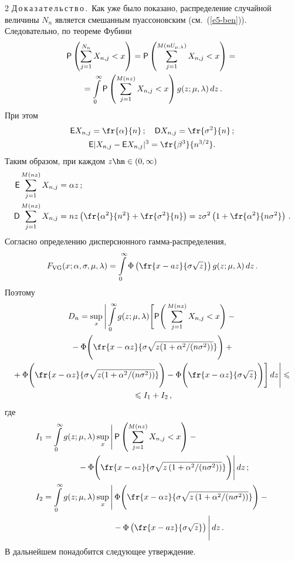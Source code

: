 \begin{multicols}{2}
\noindent
Д\,о\,к\,а\,з\,а\,т\,е\,л\,ь\,с\,т\,в\,о\,.\ Как уже было показано, распределение
случайной величины $N_n$ является смешанным пуассоновским (см.~(\ref{e5-ben})).
Следовательно, по теореме Фубини
\begin{multline*}
{\sf P}\left(\sum\limits_{j=1}^{N_n}X_{n,j}<x\right)=
{\sf P}\left(\sum\limits_{j=1}^{M(nU_{\mu,\lambda})}X_{n,j}<x\right)={}\\
{}=
\int\limits_0^{\infty}{\sf P}\left(\sum\limits_{j=1}^{M(nz)}X_{n,j}<x\right)g(z;\mu,\lambda)\,dz\,.
\end{multline*}
При этом
\begin{gather*}
{\sf E}X_{n,j}=\fr{\alpha}{n}\,;\quad
{\sf D}X_{n,j}=\fr{\sigma^2}{n}\,;\\ 
{\sf E}|X_{n,j}-{\sf E}X_{n,j}|^3=\fr{\beta^3}{n^{3/2}}.
\end{gather*}
Таким образом, при каждом $z\hm\in(0,\infty)$
\begin{align*}
{\sf E}\sum\limits_{j=1}^{M(nz)}X_{n,j}&=\alpha z\,;
\\
{\sf D}\sum\limits_{j=1}^{M(nz)}X_{n,j}&=nz\left(\fr{\alpha^2}{n^2}+\fr{\sigma^2}{n}\right)=
z\sigma^2\left(1+\fr{\alpha^2}{n\sigma^2}\right)\,.
\end{align*}
Согласно определению дисперсионного гам\-ма-рас\-пре\-де\-ления,
$$
F_{\mathrm{VG}}(x;\alpha,\sigma,\mu,\lambda)=\int\limits_{0}^{\infty}
\Phi\left(\fr{x-az}{\sigma\sqrt{z}}\right)g(z;\mu,\lambda)\,dz\,.
$$
Поэтому
\begin{multline}
D_n=\sup_x\Bigg|\int\limits_{0}^{\infty}g(z;\mu,\lambda)\Bigg[{\sf P}
\Bigg(\sum\limits_{j=1}^{M(nz)}X_{n,j}<x\Bigg)-{}\\
{}-\Phi\Bigg(\fr{x-\alpha z}
{\sigma\sqrt{z(1+{\alpha^2}/({n\sigma^2}))}}\Bigg)+{}\\
{}+\Phi\Bigg(\fr{x-\alpha z}{\sigma\sqrt{z(1+{\alpha^2}/({n\sigma^2}))}}\Bigg)-
\Phi\Bigg(\fr{x-\alpha z}{\sigma\sqrt{z}}\Bigg)\Bigg]\,dz\Bigg| \leqslant{}\\
{}\leqslant I_1+I_2\,,
\label{e6-ben}
\end{multline}
где
\begin{align*}
I_1&=\int\limits_{0}^{\infty}g(z;\mu,\lambda)\sup_x\Bigg|\,{\sf P}
\left(\sum\limits_{j=1}^{M(nz)}X_{n,j}<x\right)-{}\\
&\hspace*{15mm}{}-\Phi\Bigg(\fr{x-\alpha z}
{\sigma\sqrt{z\left(1+{\alpha^2}/(n\sigma^2)\right)}}\Bigg)\Bigg|\,dz\,;
\\
I_2&=\int\limits_{0}^{\infty}g(z;\mu,\lambda)
\sup\limits_x\Bigg|\,\Phi\Bigg(\fr{x-\alpha
z}{\sigma\sqrt{z\left(1+{\alpha^2}/(n\sigma^2)\right)}}\Bigg)-{}\\
&\hspace*{30mm}{}-
\Phi\left(\fr{x-az}{\sigma\sqrt{z}}\right)\Bigg|\,dz\,.
\end{align*}
В дальнейшем понадобится следующее утверждение.


\end{multicols}
